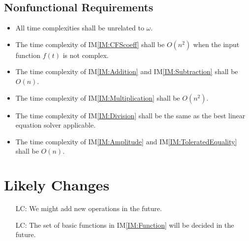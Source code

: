 \documentclass[12pt]{article}
\newcommand{\iref}[1]{IM\ref{#1}}
\newcounter{lcnum} %
\begin{document}
\subsection{Nonfunctional Requirements}

\begin{itemize}
	\item All time complexities shall be unrelated to $\omega$.
	\item The time complexity of \iref{IM:CFScoeff} shall be $O(n^2)$ 
	when the input function $f(t)$ is not complex.
	\item The time complexity of \iref{IM:Addition} and \iref{IM:Subtraction} 
	shall be $O(n)$.
	\item The time complexity of \iref{IM:Multiplication} shall be $O(n^2)$.
	\item The time complexity of \iref{IM:Division} shall be the same 
	as the best linear equation solver applicable.
	\item The time complexity of \iref{IM:Amplitude} 
	and \iref{IM:ToleratedEquality} shall be $O(n)$.
\end{itemize}

\section{Likely Changes}\label{Sc:LC}    
\noindent \begin{itemize}
\item[LC\refstepcounter{lcnum}\thelcnum\label{LC:NewOperation}:] 
We might add new operations in the future.
\item[LC\refstepcounter{lcnum}\thelcnum\label{LC:BasicFunction}:] 
The set of basic functions in \iref{IM:Function} will be 
decided in the future.
\end{itemize}
\end{document}
